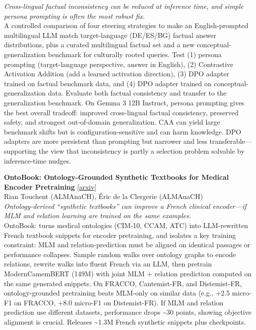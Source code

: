 \documentclass[12pt,letterpaper]{article}
\begin{document}
{\small\textit{Cross-lingual factual inconsistency can be reduced at inference time, and simple persona prompting is often the most robust fix.}}\\[1pt]
{\footnotesize A controlled comparison of four steering strategies to make an English-prompted multilingual LLM match target-language (DE/ES/BG) factual answer distributions, plus a curated multilingual factual set and a new conceptual-generalization benchmark for culturally rooted queries. Test (1) persona prompting (target-language perspective, answer in English), (2) Contrastive Activation Addition (add a learned activation direction), (3) DPO adapter trained on factual benchmark data, and (4) DPO adapter trained on conceptual-generalization data. Evaluate both factual consistency and transfer to the generalization benchmark. On Gemma 3 12B Instruct, persona prompting gives the best overall tradeoff: improved cross-lingual factual consistency, preserved safety, and strongest out-of-domain generalization. CAA can yield large benchmark shifts but is configuration-sensitive and can harm knowledge. DPO adapters are more persistent than prompting but narrower and less transferable---supporting the view that inconsistency is partly a selection problem solvable by inference-time nudges.}

\medskip

{\small\textbf{OntoBook: Ontology-Grounded Synthetic Textbooks for Medical Encoder Pretraining}} {\scriptsize[\href{https://arxiv.org/abs/2607.18927}{arxiv}]}\\
{\scriptsize Rian Touchent (ALMAnaCH), \'Eric de la Clergerie (ALMAnaCH)}\\

{\small\textit{Ontology-derived ``synthetic textbooks'' can improve a French clinical encoder---if MLM and relation learning are trained on the same examples.}}\\[1pt]
{\footnotesize OntoBook: turns medical ontologies (CIM-10, CCAM, ATC) into LLM-rewritten French textbook snippets for encoder pretraining, and isolates a key training constraint: MLM and relation-prediction must be aligned on identical passages or performance collapses. Sample random walks over ontology graphs to encode relations, rewrite walks into fluent French via an LLM, then pretrain ModernCamemBERT (149M) with joint MLM + relation prediction computed on the same generated snippets. On FRACCO, Cantemist-FR, and Distemist-FR, ontology-grounded pretraining beats MLM-only on similar data (e.g., +2.5 micro-F1 on FRACCO, +8.0 micro-F1 on Distemist-FR). If MLM and relation prediction use different datasets, performance drops \textasciitilde{}30 points, showing objective alignment is crucial. Releases \textasciitilde{}1.3M French synthetic snippets plus checkpoints.}
\end{document}
